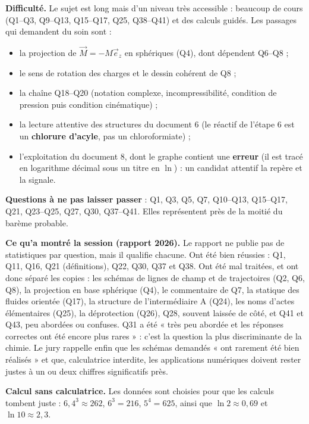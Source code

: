 \documentclass[11pt,a4paper]{article}
\providecommand{\tightlist}{\setlength{\itemsep}{0pt}\setlength{\parskip}{0pt}}
\begin{document}
\textbf{Difficulté.} Le sujet est long mais d'un niveau très accessible : beaucoup de cours (Q1--Q3, Q9--Q13, Q15--Q17, Q25, Q38--Q41) et des calculs guidés. Les passages qui demandent du soin sont :

\begin{itemize}
\tightlist
\item
  la projection de \(\vec M=-M\vec e_z\) en sphériques (Q4), dont dépendent Q6--Q8 ;
\item
  le sens de rotation des charges et le dessin cohérent de Q8 ;
\item
  la chaîne Q18--Q20 (notation complexe, incompressibilité, condition de pression puis condition cinématique) ;
\item
  la lecture attentive des structures du document 6 (le réactif de l'étape 6 est un \textbf{chlorure d'acyle}, pas un chloroformiate) ;
\item
  l'exploitation du document 8, dont le graphe contient une \textbf{erreur} (il est tracé en logarithme décimal sous un titre en \(\ln\)) : un candidat attentif la repère et la signale.
\end{itemize}

\textbf{Questions à ne pas laisser passer} : Q1, Q3, Q5, Q7, Q10--Q13, Q15--Q17, Q21, Q23--Q25, Q27, Q30, Q37--Q41. Elles représentent près de la moitié du barème probable.

\textbf{Ce qu'a montré la session (rapport 2026).} Le rapport ne publie pas de statistiques par question, mais il qualifie chacune. Ont été bien réussies : Q1, Q11, Q16, Q21 (définitions), Q22, Q30, Q37 et Q38. Ont été mal traitées, et ont donc séparé les copies : les schémas de lignes de champ et de trajectoires (Q2, Q6, Q8), la projection en base sphérique (Q4), le commentaire de Q7, la statique des fluides orientée (Q17), la structure de l'intermédiaire A (Q24), les noms d'actes élémentaires (Q25), la déprotection (Q26), Q28, souvent laissée de côté, et Q41 et Q43, peu abordées ou confuses. Q31 a été « très peu abordée et les réponses correctes ont été encore plus rares » : c'est la question la plus discriminante de la chimie. Le jury rappelle enfin que les schémas demandés « ont rarement été bien réalisés » et que, calculatrice interdite, les applications numériques doivent rester justes à un ou deux chiffres significatifs près.

\textbf{Calcul sans calculatrice.} Les données sont choisies pour que les calculs tombent juste : \(6{,}4^3\approx262\), \(6^3=216\), \(5^4=625\), ainsi que \(\ln2\approx0{,}69\) et \(\ln10\approx2{,}3\).
\end{document}
